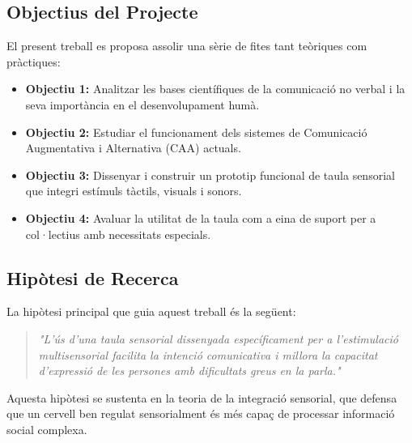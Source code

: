 
\subsection{Objectius del Projecte}
El present treball es proposa assolir una sèrie de fites tant teòriques com pràctiques:
\begin{itemize}
    \item \textbf{Objectiu 1:} Analitzar les bases científiques de la comunicació no verbal i la seva importància en el desenvolupament humà.
    \item \textbf{Objectiu 2:} Estudiar el funcionament dels sistemes de Comunicació Augmentativa i Alternativa (CAA) actuals.
    \item \textbf{Objectiu 3:} Dissenyar i construir un prototip funcional de taula sensorial que integri estímuls tàctils, visuals i sonors.
    \item \textbf{Objectiu 4:} Avaluar la utilitat de la taula com a eina de suport per a col·lectius amb necessitats especials.
\end{itemize}

\newpage
\subsection{Hipòtesi de Recerca}
La hipòtesi principal que guia aquest treball és la següent:
\begin{quote}
    \textit{"L'ús d'una taula sensorial dissenyada específicament per a l'estimulació multisensorial facilita la intenció comunicativa i millora la capacitat d'expressió de les persones amb dificultats greus en la parla."}
\end{quote}

Aquesta hipòtesi se sustenta en la teoria de la integració sensorial, que defensa que un cervell ben regulat sensorialment és més capaç de processar informació social complexa.
